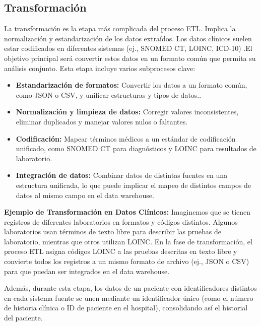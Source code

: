\documentclass[12pt, a4paper, twoside]{article}
\begin{document}
	\subsection{Transformación}
	La transformación es la etapa más complicada del proceso ETL. Implica la normalización y estandarización de los datos extraídos. Los datos clínicos suelen estar codificados en diferentes sistemas (ej., SNOMED CT, LOINC, ICD-10) \cite{KeepCodingFaseTransformacion}.El objetivo principal será convertir estos datos en un formato común que permita su análisis conjunto. Esta etapa incluye varios subprocesos clave:
	\begin{itemize}
		\item \textbf{Estandarización de formatos:} Convertir los datos a un formato común, como JSON o CSV, y unificar estructuras y tipos de datos.\cite{AsteraDataStandardization}. 
		
		\item \textbf{Normalización y limpieza de datos:} Corregir valores inconsistentes, eliminar duplicados y manejar valores nulos o faltantes. \cite{DatosMaestrosLimpiezaDatos}
		
		\item \textbf{Codificación:} Mapear términos médicos a un estándar de codificación unificado, como SNOMED CT para diagnósticos y LOINC para resultados de laboratorio. \cite{ITDOSNOMEDCT}
		
		\item \textbf{Integración de datos:} Combinar datos de distintas fuentes en una estructura unificada, lo que puede implicar el mapeo de distintos campos de datos al mismo campo en el data warehouse.
	\end{itemize}
	
	\textbf{Ejemplo de Transformación en Datos Clínicos:} Imaginemos que se tienen registros de diferentes laboratorios en formatos y códigos distintos. Algunos laboratorios usan términos de texto libre para describir las pruebas de laboratorio, mientras que otros utilizan LOINC. En la fase de transformación, el proceso ETL asigna códigos LOINC a las pruebas descritas en texto libre y convierte todos los registros a un mismo formato de archivo (ej., JSON o CSV) para que puedan ser integrados en el data warehouse.
	
	Además, durante esta etapa, los datos de un paciente con identificadores distintos en cada sistema fuente se unen mediante un identificador único (como el número de historia clínica o ID de paciente en el hospital), consolidando así el historial del paciente.
	
\end{document}
